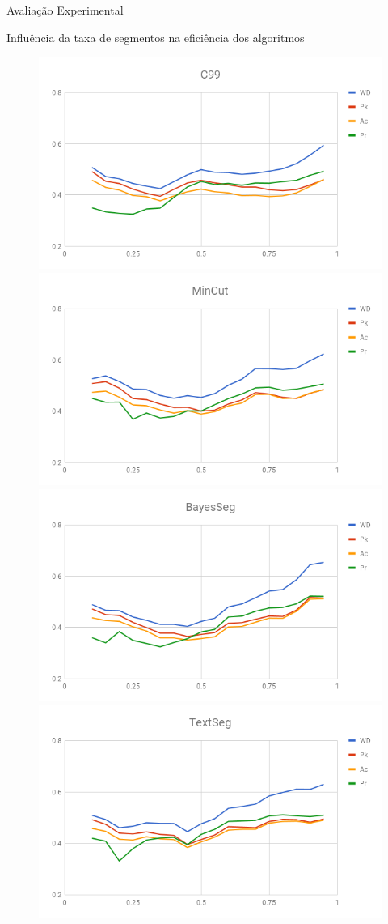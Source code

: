 \documentclass[xcolor=table]{beamer}
\begin{document}
\begin{frame}{Avaliação Experimental}

	\center Influência da taxa de segmentos na eficiência dos algoritmos

\begin{figure}[!h] \centering     %
	  \includegraphics[width=.48\textwidth]{images/graficos/analiseNSegRate-C99.png}
	  \includegraphics[width=.48\textwidth]{images/graficos/analiseNSegRate-MinCut.png} \\
	  \includegraphics[width=.48\textwidth]{images/graficos/analiseNSegRate-Bayes.png}
	  \includegraphics[width=.48\textwidth]{images/graficos/analiseNSegRate-UISeg.png}
\end{figure}


\end{frame}
\end{document}
